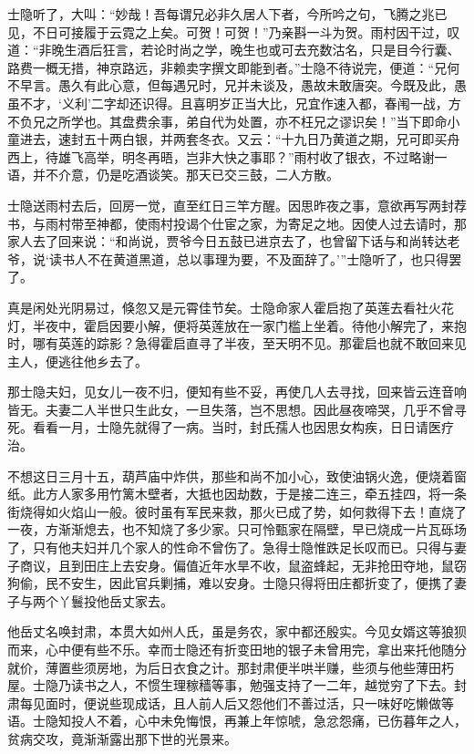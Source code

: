 \documentclass[12pt,oneside]{book}
\begin{document}
士隐听了，大叫：“妙哉！吾每谓兄必非久居人下者，今所吟之句，飞腾之兆已见，不日可接履于云霓之上矣。可贺！可贺！”乃亲斟一斗为贺。雨村因干过，叹道：“非晚生酒后狂言，若论时尚之学，晚生也或可去充数沽名，只是目今行囊、路费一概无措，神京路远，非赖卖字撰文即能到者。”士隐不待说完，便道：“兄何不早言。愚久有此心意，但每遇兄时，兄并未谈及，愚故未敢唐突。今既及此，愚虽不才，‘义利’二字却还识得。且喜明岁正当大比，兄宜作速入都，春闱一战，方不负兄之所学也。其盘费余事，弟自代为处置，亦不枉兄之谬识矣！”当下即命小童进去，速封五十两白银，并两套冬衣。又云：“十九日乃黄道之期，兄可即买舟西上，待雄飞高举，明冬再晤，岂非大快之事耶？”雨村收了银衣，不过略谢一语，并不介意，仍是吃酒谈笑。那天已交三鼓，二人方散。

士隐送雨村去后，回房一觉，直至红日三竿方醒。因思昨夜之事，意欲再写两封荐书，与雨村带至神都，使雨村投谒个仕宦之家，为寄足之地。因使人过去请时，那家人去了回来说：“和尚说，贾爷今日五鼓已进京去了，也曾留下话与和尚转达老爷，说‘读书人不在黄道黑道，总以事理为要，不及面辞了。’”士隐听了，也只得罢了。

真是闲处光阴易过，倏忽又是元霄佳节矣。士隐命家人霍启抱了英莲去看社火花灯，半夜中，霍启因要小解，便将英莲放在一家门槛上坐着。待他小解完了，来抱时，哪有英莲的踪影？急得霍启直寻了半夜，至天明不见。那霍启也就不敢回来见主人，便逃往他乡去了。

那士隐夫妇，见女儿一夜不归，便知有些不妥，再使几人去寻找，回来皆云连音响皆无。夫妻二人半世只生此女，一旦失落，岂不思想。因此昼夜啼哭，几乎不曾寻死。看看一月，士隐先就得了一病。当时，封氏孺人也因思女构疾，日日请医疗治。

不想这日三月十五，葫芦庙中炸供，那些和尚不加小心，致使油锅火逸，便烧着窗纸。此方人家多用竹篱木壁者，大抵也因劫数，于是接二连三，牵五挂四，将一条街烧得如火焰山一般。彼时虽有军民来救，那火已成了势，如何救得下去！直烧了一夜，方渐渐熄去，也不知烧了多少家。只可怜甄家在隔壁，早已烧成一片瓦砾场了，只有他夫妇并几个家人的性命不曾伤了。急得士隐惟跌足长叹而已。只得与妻子商议，且到田庄上去安身。偏值近年水旱不收，鼠盗蜂起，无非抢田夺地，鼠窃狗偷，民不安生，因此官兵剿捕，难以安身。士隐只得将田庄都折变了，便携了妻子与两个丫鬟投他岳丈家去。

他岳丈名唤封肃，本贯大如州人氏，虽是务农，家中都还殷实。今见女婿这等狼狈而来，心中便有些不乐。幸而士隐还有折变田地的银子未曾用完，拿出来托他随分就价，薄置些须房地，为后日衣食之计。那封肃便半哄半赚，些须与他些薄田朽屋。士隐乃读书之人，不惯生理稼穑等事，勉强支持了一二年，越觉穷了下去。封肃每见面时，便说些现成话，且人前人后又怨他们不善过活，只一味好吃懒做等语。士隐知投人不着，心中未免悔恨，再兼上年惊唬，急忿怨痛，已伤暮年之人，贫病交攻，竟渐渐露出那下世的光景来。
\end{document}
